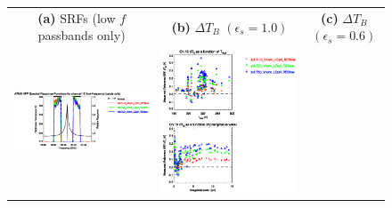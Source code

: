 \begin{figure}[H]
  \centering
  \begin{tabular}{c c c}
    \textsf{\textbf{(a)} SRFs (low $f$ passbands only)} &
    \textsf{\textbf{(b)} $\Delta T_B$ $(\epsilon_s = 1.0)$} &
    \textsf{\textbf{(c)} $\Delta T_B$ $(\epsilon_s = 0.6)$} \\
    \includegraphics[bb=80 400 280 558,clip,scale=0.85]{graphics/srf/Tset/atms_npp.ch12.osrf.eps} &
    \includegraphics[bb=85 400 260 558,clip,scale=0.85]{graphics/dtb/Tset/e1.0_r0.0/atms_npp.ch12.dTb.eps} & 

\end{tabular}
\end{figure}
